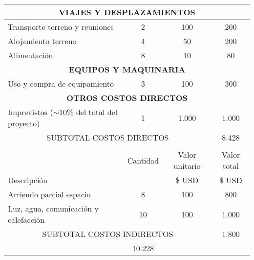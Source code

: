 \documentclass[
11pt, %
codirector, %
]{charter}
\begin{document}
\begin{enumerate}
\begin{table}[htpb]
\begin{tabularx}{\linewidth}{@{}|X|c|r|r|@{}}
		
		\multicolumn{4}{|c|}{\textbf{VIAJES Y DESPLAZAMIENTOS}}\\ \hline
		Transporte terreno y reuniones	& \multicolumn{1}{c|}{	2	} & \multicolumn{1}{c|}{	100	} &  \multicolumn{1}{c|}{	200	} \\ \hline
		Alojamiento terreno 			& \multicolumn{1}{c|}{	4	} & \multicolumn{1}{c|}{	50	} &  \multicolumn{1}{c|}{	200	} \\ \hline
		Alimentación					& \multicolumn{1}{c|}{	8	} & \multicolumn{1}{c|}{	10	} &  \multicolumn{1}{c|}{	80	} \\ \hline
		
		\multicolumn{4}{|c|}{\textbf{EQUIPOS Y MAQUINARIA}}\\ \hline
		Uso y compra de equipamiento& \multicolumn{1}{c|}{	3	} & \multicolumn{1}{c|}{	100	} &  \multicolumn{1}{c|}{	300	} \\ \hline
		
		\multicolumn{4}{|c|}{\textbf{OTROS COSTOS DIRECTOS}}\\ \hline
		Imprevistos	($\sim$10\% del total del  proyecto)				& \multicolumn{1}{c|}{	1	} & \multicolumn{1}{c|}{	1.000	} &  \multicolumn{1}{c|}{	1.000	} \\ \hline
		
		\multicolumn{3}{|c|}{SUBTOTAL COSTOS DIRECTOS} & \multicolumn{1}{c|}{ 8.428 } \\ \hline
		
		\rowcolor[HTML]{C0C0C0} 
		\multicolumn{4}{|c|}{\cellcolor[HTML]{C0C0C0}COSTOS INDIRECTOS} \\ \hline
		\rowcolor[HTML]{C0C0C0} 
		&
		\multicolumn{1}{c|}{\cellcolor[HTML]{C0C0C0}Cantidad} &
		\multicolumn{1}{c|}{\cellcolor[HTML]{C0C0C0}Valor unitario} &
		\multicolumn{1}{c|}{\cellcolor[HTML]{C0C0C0}Valor total} \\  
		\rowcolor[HTML]{C0C0C0} Descripción  &
		\multicolumn{1}{c|}{\cellcolor[HTML]{C0C0C0}} &
		\multicolumn{1}{c|}{\cellcolor[HTML]{C0C0C0} \$ USD} &
		\multicolumn{1}{c|}{\cellcolor[HTML]{C0C0C0} \$ USD} \\ \hline
		Arriendo parcial espacio	& \multicolumn{1}{c|}{	8	} & \multicolumn{1}{c|}{	100	} &  \multicolumn{1}{c|}{	800	} \\ \hline
		Luz, agua, comunicación y calefacción	& \multicolumn{1}{c|}{	10	} & \multicolumn{1}{c|}{	100	} &  \multicolumn{1}{c|}{	1.000	} \\ \hline
		
		\multicolumn{3}{|c|}{SUBTOTAL COSTOS INDIRECTOS} &
		\multicolumn{1}{c|}{1.800 } \\ \hline
		\rowcolor[HTML]{C0C0C0}
		\multicolumn{3}{|c|}{TOTAL} &
		\multicolumn{1}{c|}{10.228 }
		\\ \hline
	\end{tabularx}%
\end{table}


\end{enumerate}
\end{document}
